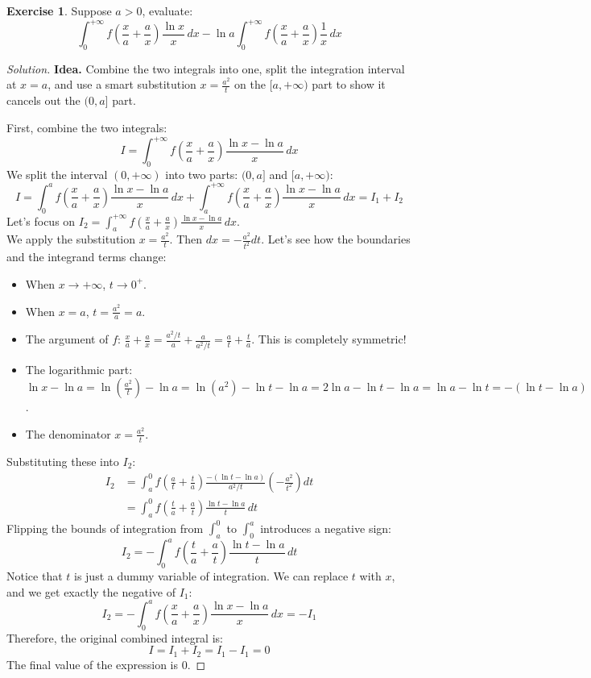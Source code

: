\documentclass[11pt]{article}
\theoremstyle{definition}
\newtheorem{exercise}{Exercise}[section]
\newenvironment{solution}{\begin{proof}[Solution]}{\end{proof}}
\begin{document}
\begin{exercise}
Suppose $a>0$, evaluate:
\[
\int_{0}^{+\infty}f\left(\frac{x}{a}+\frac{a}{x}\right)\frac{\ln x}{x}\,dx - \ln a\int_{0}^{+\infty}f\left(\frac{x}{a}+\frac{a}{x}\right)\frac{1}{x}\,dx
\]
\end{exercise}

\begin{solution}
\textbf{Idea.} Combine the two integrals into one, split the integration interval at $x=a$, and use a smart substitution $x = \frac{a^2}{t}$ on the $[a, +\infty)$ part to show it cancels out the $(0, a]$ part.

First, combine the two integrals:
\[
I = \int_{0}^{+\infty} f\left(\frac{x}{a}+\frac{a}{x}\right) \frac{\ln x - \ln a}{x} \,dx
\]
We split the interval $(0, +\infty)$ into two parts: $(0, a]$ and $[a, +\infty)$:
\[
I = \int_{0}^{a} f\left(\frac{x}{a}+\frac{a}{x}\right) \frac{\ln x - \ln a}{x} \,dx + \int_{a}^{+\infty} f\left(\frac{x}{a}+\frac{a}{x}\right) \frac{\ln x - \ln a}{x} \,dx = I_1 + I_2
\]
Let's focus on $I_2 = \int_{a}^{+\infty} f\left(\frac{x}{a}+\frac{a}{x}\right) \frac{\ln x - \ln a}{x} \,dx$. \\
We apply the substitution $x = \frac{a^2}{t}$. Then $dx = -\frac{a^2}{t^2} dt$.
Let's see how the boundaries and the integrand terms change:
\begin{itemize}
    \item When $x \to +\infty$, $t \to 0^+$.
    \item When $x = a$, $t = \frac{a^2}{a} = a$.
    \item The argument of $f$: $\frac{x}{a} + \frac{a}{x} = \frac{a^2/t}{a} + \frac{a}{a^2/t} = \frac{a}{t} + \frac{t}{a}$. This is completely symmetric!
    \item The logarithmic part: $\ln x - \ln a = \ln\left(\frac{a^2}{t}\right) - \ln a = \ln(a^2) - \ln t - \ln a = 2\ln a - \ln t - \ln a = \ln a - \ln t = -(\ln t - \ln a)$.
    \item The denominator $x = \frac{a^2}{t}$.
\end{itemize}
Substituting these into $I_2$:
\begin{align*}
I_2 &= \int_{a}^{0} f\left(\frac{a}{t}+\frac{t}{a}\right) \frac{-(\ln t - \ln a)}{a^2/t} \left(-\frac{a^2}{t^2}\right) dt \\
&= \int_{a}^{0} f\left(\frac{t}{a}+\frac{a}{t}\right) \frac{\ln t - \ln a}{t} \,dt
\end{align*}
Flipping the bounds of integration from $\int_a^0$ to $\int_0^a$ introduces a negative sign:
\[
I_2 = -\int_{0}^{a} f\left(\frac{t}{a}+\frac{a}{t}\right) \frac{\ln t - \ln a}{t} \,dt
\]
Notice that $t$ is just a dummy variable of integration. We can replace $t$ with $x$, and we get exactly the negative of $I_1$:
\[
I_2 = -\int_{0}^{a} f\left(\frac{x}{a}+\frac{a}{x}\right) \frac{\ln x - \ln a}{x} \,dx = -I_1
\]
Therefore, the original combined integral is:
\[
I = I_1 + I_2 = I_1 - I_1 = 0
\]
The final value of the expression is $0$.
\end{solution}
\end{document}
